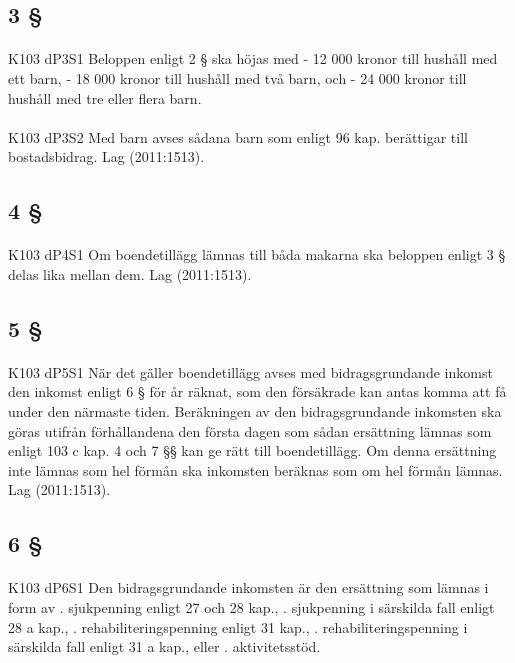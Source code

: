 \documentclass[a4paper,notitlepage,openany,10pt]{book}
\begin{document}
\subsection*{3 §}
\paragraph*{}
{\tiny K103 dP3S1}
Beloppen enligt 2 § ska höjas med
\newline - 12 000 kronor till hushåll med ett barn,
\newline - 18 000 kronor till hushåll med två barn, och
\newline - 24 000 kronor till hushåll med tre eller flera barn.
\paragraph*{}
{\tiny K103 dP3S2}
Med barn avses sådana barn som enligt 96 kap. berättigar till bostadsbidrag.
Lag (2011:1513).
\subsection*{4 §}
\paragraph*{}
{\tiny K103 dP4S1}
Om boendetillägg lämnas till båda makarna ska beloppen enligt 3 § delas lika mellan dem.
Lag (2011:1513).
\subsection*{5 §}
\paragraph*{}
{\tiny K103 dP5S1}
När det gäller boendetillägg avses med bidragsgrundande inkomst den inkomst enligt 6 § för år räknat, som den försäkrade kan antas komma att få under den närmaste tiden.
Beräkningen av den bidragsgrundande inkomsten ska göras utifrån förhållandena den första dagen som sådan ersättning lämnas som enligt 103 c kap. 4 och 7 §§ kan ge rätt till boendetillägg. Om denna ersättning inte lämnas som hel förmån ska inkomsten beräknas som om hel förmån lämnas.
Lag (2011:1513).
\subsection*{6 §}
\paragraph*{}
{\tiny K103 dP6S1}
Den bidragsgrundande inkomsten är den ersättning som lämnas i form av
. sjukpenning enligt 27 och 28 kap.,
. sjukpenning i särskilda fall enligt 28 a kap.,
. rehabiliteringspenning enligt 31 kap.,
. rehabiliteringspenning i särskilda fall enligt 31 a kap., eller
. aktivitetsstöd.
\end{document}
